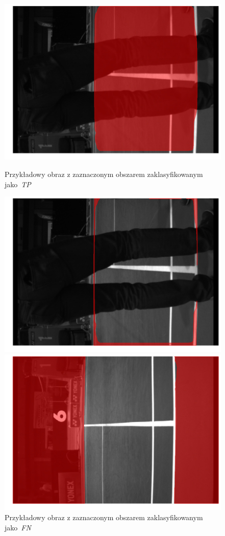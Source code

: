 \begin{figure}[!htb]
    \includegraphics[width=\linewidth]{TP_frame_9.jpg}
    \caption{Przykładowy obraz z zaznaczonym obszarem zaklasyfikowanym jako~\textit{TP}}
    \label{fig:TP}
  \endminipage\hfill
    \includegraphics[width=\linewidth]{FN_frame_9.jpg}
    \caption{Przykładowy obraz z zaznaczonym obszarem zaklasyfikowanym jako~\textit{FN}}
    \label{fig:FN}
  \endminipage\hfill
  \vspace{0.5cm}
    \includegraphics[width=\linewidth]{TN_frame_8.jpg}

\end{figure}
